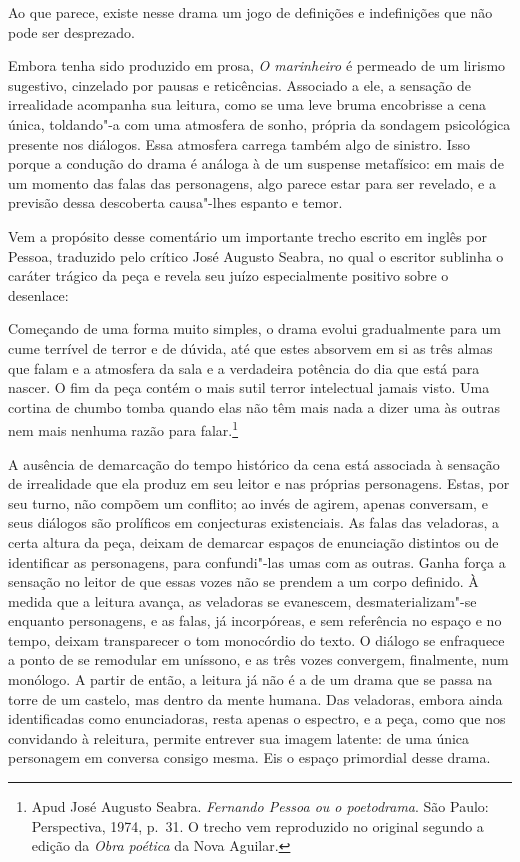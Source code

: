 Ao que parece, existe nesse drama um jogo de definições e
indefinições que não pode ser desprezado.

Embora tenha sido produzido em prosa, \textit{O marinheiro} é 
permeado
de um lirismo sugestivo, cinzelado por pausas e reticências.
Associado
a ele, a sensação de irrealidade acompanha sua leitura, como se uma
leve bruma encobrisse a cena única, toldando"-a com uma atmosfera de
sonho, própria da sondagem psicológica presente nos diálogos. Essa
atmosfera carrega também algo de sinistro. Isso porque a 
condução do
drama é análoga à de um suspense metafísico: em mais de um momento das
falas das personagens, algo parece estar para ser revelado, e a
previsão dessa descoberta causa"-lhes espanto e temor. 

Vem a propósito desse comentário um importante trecho escrito em inglês
por Pessoa, traduzido pelo crítico José Augusto Seabra, no qual o
escritor sublinha o caráter trágico da peça e revela seu juízo
especialmente positivo sobre o desenlace:

\begin{hedraquote}
Começando de uma forma muito simples, o drama evolui 
gradualmente para
um cume terrível de terror e de dúvida, 
até que estes absorvem em si as
três almas que falam e a atmosfera da 
sala e a verdadeira potência do
dia que está para nascer. O fim da peça 
contém o mais sutil terror
intelectual jamais visto. Uma cortina de 
chumbo tomba quando elas não
têm mais nada a dizer uma às outras nem mais nenhuma razão para
falar.\footnote{ Apud José Augusto Seabra.
\textit{Fernando Pessoa ou
o poetodrama}. São Paulo: Perspectiva, 1974, p.~31. O trecho vem
reproduzido no original segundo a edição da \textit{Obra poética} 
da Nova Aguilar.}
\end{hedraquote}

A ausência de demarcação do tempo histórico
da cena está associada à
sensação de irrealidade que ela produz em seu leitor e nas próprias
personagens. Estas, por seu turno, não compõem 
um conflito; ao invés de
agirem, apenas conversam, e seus diálogos são 
prolíficos em conjecturas
existenciais. As falas das veladoras, a certa 
altura da peça, deixam de
demarcar espaços de enunciação distintos ou de identificar as
personagens, para confundi"-las umas com as outras. Ganha força a
sensação no leitor de que essas vozes não se prendem a um corpo
definido. À medida que a leitura avança, as veladoras se evanescem,
desmaterializam"-se enquanto personagens, e as falas, 
já incorpóreas, e
sem referência no espaço e no tempo, deixam transparecer o tom
monocórdio do texto. O diálogo se enfraquece a ponto de 
se remodular em
uníssono, e as três vozes convergem, finalmente, 
num monólogo. A partir
de então, a leitura já não é a de um drama que se 
passa na torre de um
castelo, mas dentro da mente humana. Das veladoras, embora ainda
identificadas como enunciadoras, resta apenas o espectro, e a peça,
como que nos convidando à releitura, permite entrever sua imagem
latente: de uma única personagem em conversa consigo mesma. Eis o
espaço primordial desse drama.

